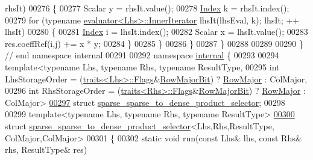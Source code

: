 \begin{DoxyCode}
      rhsIt)
00276     \{
00277       Scalar y = rhsIt.value();
00278       \hyperlink{namespace_eigen_a62e77e0933482dafde8fe197d9a2cfde}{Index} k = rhsIt.index();
00279       \textcolor{keywordflow}{for} (\textcolor{keyword}{typename} \hyperlink{struct_eigen_1_1internal_1_1evaluator}{evaluator<Lhs>::InnerIterator} lhsIt(lhsEval, k); lhsIt; ++
      lhsIt)
00280       \{
00281         \hyperlink{namespace_eigen_a62e77e0933482dafde8fe197d9a2cfde}{Index} i = lhsIt.index();
00282         Scalar x = lhsIt.value();
00283         res.coeffRef(i,j) += x * y;
00284       \}
00285     \}
00286   \}
00287 \}
00288 
00289 
00290 \} \textcolor{comment}{// end namespace internal}
00291 
00292 \textcolor{keyword}{namespace }\hyperlink{namespaceinternal}{internal} \{
00293 
00294 \textcolor{keyword}{template}<\textcolor{keyword}{typename} Lhs, \textcolor{keyword}{typename} Rhs, \textcolor{keyword}{typename} ResultType,
00295   \textcolor{keywordtype}{int} LhsStorageOrder = (\hyperlink{struct_eigen_1_1internal_1_1traits}{traits<Lhs>::Flags}&\hyperlink{group__flags_gae4f56c2a60bbe4bd2e44c5b19cbe8762}{RowMajorBit}) ? 
      \hyperlink{group__enums_ggaacded1a18ae58b0f554751f6cdf9eb13acfcde9cd8677c5f7caf6bd603666aae3}{RowMajor} : ColMajor,
00296   \textcolor{keywordtype}{int} RhsStorageOrder = (\hyperlink{struct_eigen_1_1internal_1_1traits}{traits<Rhs>::Flags}&\hyperlink{group__flags_gae4f56c2a60bbe4bd2e44c5b19cbe8762}{RowMajorBit}) ? 
      \hyperlink{group__enums_ggaacded1a18ae58b0f554751f6cdf9eb13acfcde9cd8677c5f7caf6bd603666aae3}{RowMajor} : ColMajor>
\hyperlink{struct_eigen_1_1internal_1_1sparse__sparse__to__dense__product__selector}{00297} \textcolor{keyword}{struct }\hyperlink{struct_eigen_1_1internal_1_1sparse__sparse__to__dense__product__selector}{sparse\_sparse\_to\_dense\_product\_selector};
00298 
00299 \textcolor{keyword}{template}<\textcolor{keyword}{typename} Lhs, \textcolor{keyword}{typename} Rhs, \textcolor{keyword}{typename} ResultType>
\hyperlink{struct_eigen_1_1internal_1_1sparse__sparse__to__dense__product__selector_3_01_lhs_00_01_rhs_00_0b0481ed72407c1b6a48b36ffd79869ef}{00300} \textcolor{keyword}{struct }\hyperlink{struct_eigen_1_1internal_1_1sparse__sparse__to__dense__product__selector}{sparse\_sparse\_to\_dense\_product\_selector}<Lhs,Rhs,ResultType,
      ColMajor,ColMajor>
00301 \{
00302   \textcolor{keyword}{static} \textcolor{keywordtype}{void} run(\textcolor{keyword}{const} Lhs& lhs, \textcolor{keyword}{const} Rhs& rhs, ResultType& res)

\end{DoxyCode}
